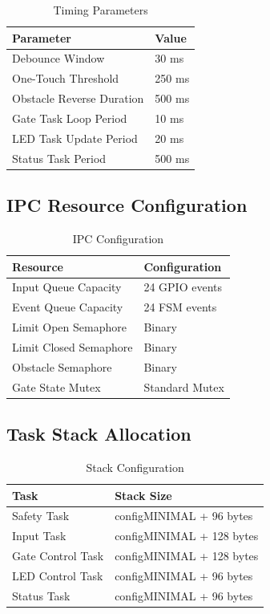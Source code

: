 \documentclass[11pt,a4paper]{article}
\begin{document}
\begin{table}[H]
\centering
\small
\begin{tabular}{ll}
\toprule
\textbf{Parameter} & \textbf{Value} \\
\midrule
Debounce Window & 30 ms \\
One-Touch Threshold & 250 ms \\
Obstacle Reverse Duration & 500 ms \\
Gate Task Loop Period & 10 ms \\
LED Task Update Period & 20 ms \\
Status Task Period & 500 ms \\
\bottomrule
\end{tabular}
\caption{Timing Parameters}
\label{tab:timing}
\end{table}

\subsection{IPC Resource Configuration}

\begin{table}[H]
\centering
\small
\begin{tabular}{ll}
\toprule
\textbf{Resource} & \textbf{Configuration} \\
\midrule
Input Queue Capacity & 24 GPIO events \\
Event Queue Capacity & 24 FSM events \\
Limit Open Semaphore & Binary \\
Limit Closed Semaphore & Binary \\
Obstacle Semaphore & Binary \\
Gate State Mutex & Standard Mutex \\
\bottomrule
\end{tabular}
\caption{IPC Configuration}
\label{tab:ipc-config}
\end{table}

\subsection{Task Stack Allocation}

\begin{table}[H]
\centering
\small
\begin{tabular}{ll}
\toprule
\textbf{Task} & \textbf{Stack Size} \\
\midrule
Safety Task & configMINIMAL + 96 bytes \\
Input Task & configMINIMAL + 128 bytes \\
Gate Control Task & configMINIMAL + 128 bytes \\
LED Control Task & configMINIMAL + 96 bytes \\
Status Task & configMINIMAL + 96 bytes \\
\bottomrule
\end{tabular}
\caption{Stack Configuration}
\label{tab:stack}
\end{table}
\end{document}
